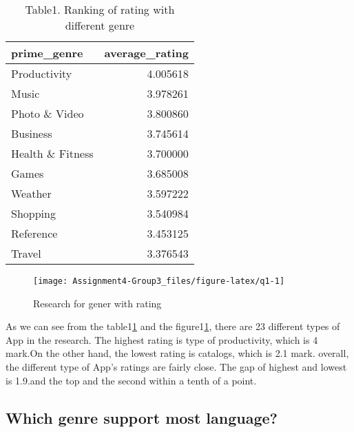 \documentclass[
]{article}
\begin{document}
\begin{table}[!h]

\caption{\label{tab:q1}Table1. Ranking of rating with different genre}
\centering
\begin{tabular}[t]{l|r}
\hline
prime\_genre & average\_rating\\
\hline
\rowcolor{gray!6}  Productivity & 4.005618\\
\hline
Music & 3.978261\\
\hline
\rowcolor{gray!6}  Photo \& Video & 3.800860\\
\hline
Business & 3.745614\\
\hline
\rowcolor{gray!6}  Health \& Fitness & 3.700000\\
\hline
Games & 3.685008\\
\hline
\rowcolor{gray!6}  Weather & 3.597222\\
\hline
Shopping & 3.540984\\
\hline
\rowcolor{gray!6}  Reference & 3.453125\\
\hline
Travel & 3.376543\\
\hline
\end{tabular}
\end{table}

\begin{figure}

{\centering \texttt{[image: Assignment4-Group3\_files/figure-latex/q1-1]} 

}

\caption{Research for gener with rating }\label{fig:q1}
\end{figure}

As we can see from the table1\ref{tab:q1} and the figure1\ref{fig:q1}, there are 23 different types of App in the research. The highest rating is type of productivity, which is 4 mark.On the other hand, the lowest rating is catalogs, which is 2.1 mark. overall, the different type of App's ratings are fairly close. The gap of highest and lowest is 1.9.and the top and the second within a tenth of a point.

\hypertarget{which-genre-support-most-language}{%
\subsection{Which genre support most language?}\label{which-genre-support-most-language}}
\end{document}
